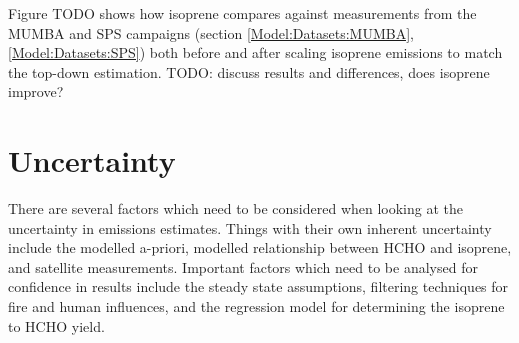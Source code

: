     Figure TODO shows how isoprene compares against measurements from the MUMBA and SPS campaigns (section \ref{Model:Datasets:MUMBA}, \ref{Model:Datasets:SPS}) both before and after scaling isoprene emissions to match the top-down estimation.
    TODO: discuss results and differences, does isoprene improve?
    

\section{Uncertainty}
\label{BioIsop:Uncertainty}

  There are several factors which need to be considered when looking at the uncertainty in emissions estimates.
  Things with their own inherent uncertainty include the modelled a-priori, modelled relationship between HCHO and isoprene, and satellite measurements.
  Important factors which need to be analysed for confidence in results include the steady state assumptions, filtering techniques for fire and human influences, and the regression model for determining the isoprene to HCHO yield.
  
